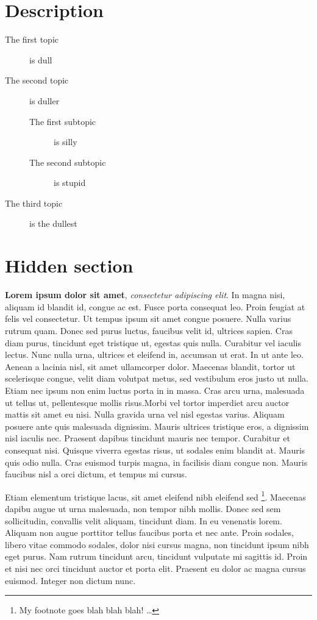 \section*{Description}
\begin{description}
\item[The first topic] is dull
\item[The second topic] is duller
\begin{description}
\item[The first subtopic] is silly
\item[The second subtopic] is stupid
\end{description}
\item[The third topic] is the dullest
\end{description}


\clearpage

\tochide\section{Hidden section}
\textbf{Lorem ipsum dolor sit amet}, \textit{consectetur adipiscing elit}. In magna nisi, aliquam id blandit id, congue ac est. Fusce porta consequat leo. Proin feugiat at felis vel consectetur. Ut tempus ipsum sit amet congue posuere. Nulla varius rutrum quam. Donec sed purus luctus, faucibus velit id, ultrices sapien. Cras diam purus, tincidunt eget tristique ut, egestas quis nulla. Curabitur vel iaculis lectus. Nunc nulla urna, ultrices et eleifend in, accumsan ut erat. In ut ante leo. Aenean a lacinia nisl, sit amet ullamcorper dolor. Maecenas blandit, tortor ut scelerisque congue, velit diam volutpat metus, sed vestibulum eros justo ut nulla. Etiam nec ipsum non enim luctus porta in in massa. Cras arcu urna, malesuada ut tellus ut, pellentesque mollis risus.Morbi vel tortor imperdiet arcu auctor mattis sit amet eu nisi. Nulla gravida urna vel nisl egestas varius. Aliquam posuere ante quis malesuada dignissim. Mauris ultrices tristique eros, a dignissim nisl iaculis nec. Praesent dapibus tincidunt mauris 
nec tempor. Curabitur et consequat nisi. Quisque viverra egestas risus, ut sodales enim blandit at. Mauris quis odio nulla. Cras euismod turpis magna, in facilisis diam congue non. Mauris faucibus nisl a orci dictum, et tempus mi cursus.

Etiam elementum tristique lacus, sit amet eleifend nibh eleifend sed \footnote{My footnote goes blah blah blah! \dots}. Maecenas dapibu augue ut urna malesuada, non tempor nibh mollis. Donec sed sem sollicitudin, convallis velit aliquam, tincidunt diam. In eu venenatis lorem. Aliquam non augue porttitor tellus faucibus porta et nec ante. Proin sodales, libero vitae commodo sodales, dolor nisi cursus magna, non tincidunt ipsum nibh eget purus. Nam rutrum tincidunt arcu, tincidunt vulputate mi sagittis id. Proin et nisi nec orci tincidunt auctor et porta elit. Praesent eu dolor ac magna cursus euismod. Integer non dictum nunc.


